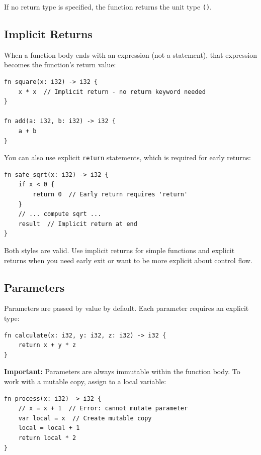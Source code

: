 If no return type is specified, the function returns the unit type \texttt{()}.

\subsection{Implicit Returns}
\label{subsec:implicit-returns}

When a function body ends with an expression (not a statement), that expression becomes the function's return value:

\begin{lstlisting}
fn square(x: i32) -> i32 {
    x * x  // Implicit return - no return keyword needed
}

fn add(a: i32, b: i32) -> i32 {
    a + b
}
\end{lstlisting}

You can also use explicit \texttt{return} statements, which is required for early returns:

\begin{lstlisting}
fn safe_sqrt(x: i32) -> i32 {
    if x < 0 {
        return 0  // Early return requires 'return'
    }
    // ... compute sqrt ...
    result  // Implicit return at end
}
\end{lstlisting}

Both styles are valid. Use implicit returns for simple functions and explicit returns when you need early exit or want to be more explicit about control flow.

\subsection{Parameters}
\label{subsec:parameters}

Parameters are passed by value by default. Each parameter requires an explicit type:

\begin{lstlisting}
fn calculate(x: i32, y: i32, z: i32) -> i32 {
    return x + y * z
}
\end{lstlisting}

\textbf{Important:} Parameters are always immutable within the function body. To work with a mutable copy, assign to a local variable:

\begin{lstlisting}
fn process(x: i32) -> i32 {
    // x = x + 1  // Error: cannot mutate parameter
    var local = x  // Create mutable copy
    local = local + 1
    return local * 2
}
\end{lstlisting}

